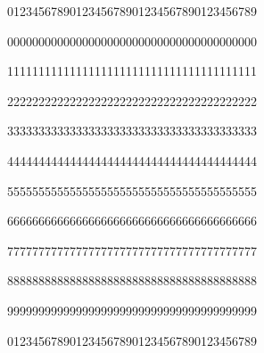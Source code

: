 
\null\par{\mktsTightParagraphs{}0123456789012345678901234567890123456789\par
0000000000000000000000000000000000000000\par
1111111111111111111111111111111111111111\par
2222222222222222222222222222222222222222\par
3333333333333333333333333333333333333333\par
4444444444444444444444444444444444444444\par
5555555555555555555555555555555555555555\par
6666666666666666666666666666666666666666\par
7777777777777777777777777777777777777777\par
8888888888888888888888888888888888888888\par
9999999999999999999999999999999999999999\par
0123456789012345678901234567890123456789\par
}


